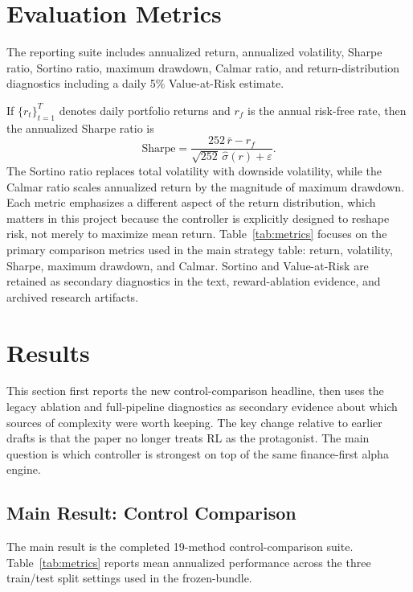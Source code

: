 \documentclass[10pt,twocolumn]{article}
\begin{document}
\section{Evaluation Metrics}

The reporting suite includes annualized return, annualized volatility, Sharpe
ratio, Sortino ratio, maximum drawdown, Calmar ratio, and return-distribution
diagnostics including a daily 5\% Value-at-Risk estimate.

If $\{r_t\}_{t=1}^T$ denotes daily portfolio returns and $r_f$ is the annual
risk-free rate, then the annualized Sharpe ratio is
\[
\text{Sharpe} = \frac{252 \, \bar{r} - r_f}{\sqrt{252}\,\hat{\sigma}(r) + \varepsilon}.
\]
The Sortino ratio replaces total volatility with downside volatility, while the
Calmar ratio scales annualized return by the magnitude of maximum drawdown. Each
metric emphasizes a different aspect of the return distribution, which matters
in this project because the controller is explicitly designed to reshape risk,
not merely to maximize mean return. Table~\ref{tab:metrics} focuses on the
primary comparison metrics used in the main strategy table: return, volatility,
Sharpe, maximum drawdown, and Calmar. Sortino and Value-at-Risk are retained as
secondary diagnostics in the text, reward-ablation evidence, and archived
research artifacts.

\section{Results}

This section first reports the new control-comparison headline, then uses the
legacy ablation and full-pipeline diagnostics as secondary evidence about which
sources of complexity were worth keeping. The key change relative to earlier
drafts is that the paper no longer treats RL as the protagonist. The main
question is which controller is strongest on top of the same finance-first
alpha engine.

\subsection{Main Result: Control Comparison}

The main result is the completed 19-method control-comparison suite.
Table~\ref{tab:metrics} reports mean annualized performance across the three
train/test split settings used in the frozen-bundle.
\end{document}
